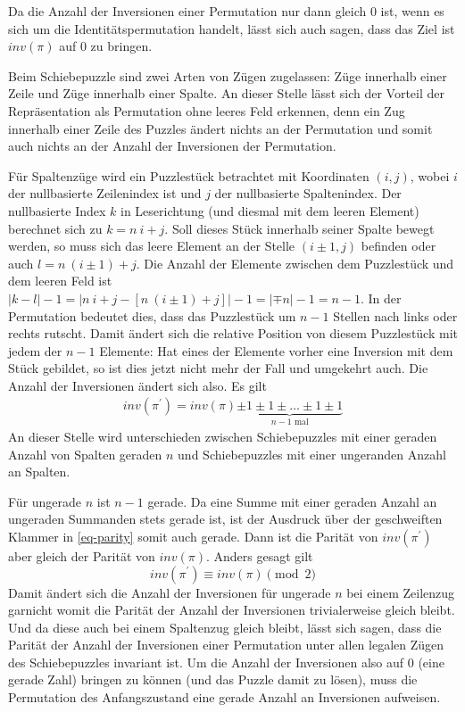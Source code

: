 \documentclass{whswinvcbook}
\begin{document}
Da die Anzahl der Inversionen einer Permutation nur dann gleich $0$ ist, wenn es sich um die Identitätspermutation handelt, lässt sich auch sagen, dass das Ziel ist $inv(\pi)$ auf $0$ zu bringen.

Beim Schiebepuzzle sind zwei Arten von Zügen zugelassen: Züge innerhalb einer Zeile und Züge innerhalb einer Spalte. An dieser Stelle lässt sich der Vorteil der Repräsentation als Permutation ohne leeres Feld erkennen, denn ein Zug innerhalb einer Zeile des Puzzles ändert nichts an der Permutation und somit auch nichts an der Anzahl der Inversionen der Permutation.

Für Spaltenzüge wird ein Puzzlestück betrachtet mit Koordinaten $(i,j)$, wobei $i$ der nullbasierte Zeilenindex ist und $j$ der nullbasierte Spaltenindex. Der nullbasierte Index $k$ in Leserichtung (und diesmal mit dem leeren Element) berechnet sich zu $k=n\:i+j$. Soll dieses Stück innerhalb seiner Spalte bewegt werden, so muss sich das leere Element an der Stelle $(i\pm1,j)$ befinden oder auch $l=n\:(i\pm1)+j$. Die Anzahl der Elemente zwischen dem Puzzlestück und dem leeren Feld ist $|k-l|-1=|n\:i+j-[n\:(i\pm1)+j]|-1=|\mp n|-1=n-1$. In der Permutation bedeutet dies, dass das Puzzlestück um $n-1$ Stellen nach links oder rechts rutscht. Damit ändert sich die relative Position von diesem Puzzlestück mit jedem der $n-1$ Elemente: Hat eines der Elemente vorher eine Inversion mit dem Stück gebildet, so ist dies jetzt nicht mehr der Fall und umgekehrt auch. Die Anzahl der Inversionen ändert sich also. Es gilt
\begin{align}\label{eq-parity}
    inv(\pi^\prime)=inv(\pi)\underbrace{\pm1\pm1\pm\dots\pm1\pm1}_{n-1\text{ mal}}
\end{align}
An dieser Stelle wird unterschieden zwischen Schiebepuzzles mit einer geraden Anzahl von Spalten geraden $n$ und Schiebepuzzles mit einer ungeranden Anzahl an Spalten.

Für ungerade $n$ ist $n-1$ gerade. Da eine Summe mit einer geraden Anzahl an ungeraden Summanden stets gerade ist, ist der Ausdruck über der geschweiften Klammer in \ref{eq-parity} somit auch gerade. Dann ist die Parität von $inv(\pi^\prime)$ aber gleich der Parität von $inv(\pi)$. Anders gesagt gilt$$inv(\pi^\prime)\equiv inv(\pi)\pmod2$$
Damit ändert sich die Anzahl der Inversionen für ungerade $n$ bei einem Zeilenzug garnicht womit die Parität der Anzahl der Inversionen trivialerweise gleich bleibt. Und da diese auch bei einem Spaltenzug gleich bleibt, lässt sich sagen, dass die Parität der Anzahl der Inversionen einer Permutation unter allen legalen Zügen des Schiebepuzzles invariant ist. Um die Anzahl der Inversionen also auf $0$ (eine gerade Zahl) bringen zu können (und das Puzzle damit zu lösen), muss die Permutation des Anfangszustand eine gerade Anzahl an Inversionen aufweisen.
\end{document}
